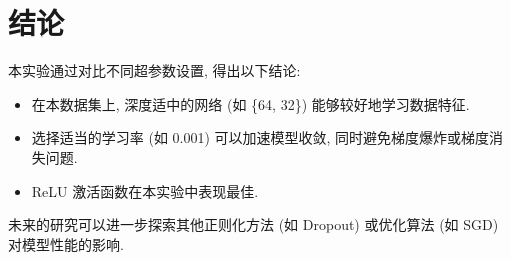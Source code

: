 \documentclass{article}
\begin{document}
	\section{结论}
		本实验通过对比不同超参数设置, 得出以下结论:

		\begin{itemize}
			\item 在本数据集上, 深度适中的网络 (如 \{64, 32\}) 能够较好地学习数据特征.
			\item 选择适当的学习率 (如 0.001) 可以加速模型收敛, 同时避免梯度爆炸或梯度消失问题.
			\item ReLU 激活函数在本实验中表现最佳.
		\end{itemize}

		未来的研究可以进一步探索其他正则化方法 (如 Dropout) 或优化算法 (如 SGD) 对模型性能的影响.
\end{document}
